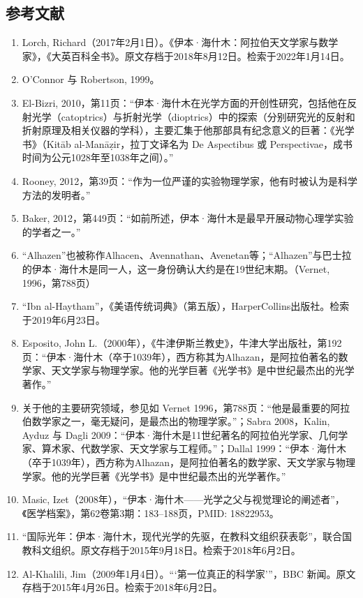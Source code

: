 \subsection{参考文献}
\begin{enumerate}
\item Lorch, Richard（2017年2月1日）。《伊本·海什木：阿拉伯天文学家与数学家》，《大英百科全书》。原文存档于2018年8月12日。检索于2022年1月14日。
\item O'Connor 与 Robertson, 1999。
\item El-Bizri, 2010，第11页：“伊本·海什木在光学方面的开创性研究，包括他在反射光学（catoptrics）与折射光学（dioptrics）中的探索（分别研究光的反射和折射原理及相关仪器的学科），主要汇集于他那部具有纪念意义的巨著：《光学书》（Kitāb al-Manāẓir，拉丁文译名为 De Aspectibus 或 Perspectivae，成书时间为公元1028年至1038年之间）。”
\item Rooney, 2012，第39页：“作为一位严谨的实验物理学家，他有时被认为是科学方法的发明者。”
\item Baker, 2012，第449页：“如前所述，伊本·海什木是最早开展动物心理学实验的学者之一。”
\item “Alhazen”也被称作Alhacen、Avennathan、Avenetan等；“Alhazen”与巴士拉的伊本·海什木是同一人，这一身份确认大约是在19世纪末期。（Vernet, 1996，第788页）
\item “Ibn al-Haytham”，《美语传统词典》（第五版），HarperCollins出版社。检索于2019年6月23日。
\item Esposito, John L.（2000年），《牛津伊斯兰教史》，牛津大学出版社，第192页：“伊本·海什木（卒于1039年），西方称其为Alhazan，是阿拉伯著名的数学家、天文学家与物理学家。他的光学巨著《光学书》是中世纪最杰出的光学著作。”
\item 关于他的主要研究领域，参见如 Vernet 1996，第788页：“他是最重要的阿拉伯数学家之一，毫无疑问，是最杰出的物理学家。”；Sabra 2008，Kalin, Ayduz 与 Dagli 2009：“伊本·海什木是11世纪著名的阿拉伯光学家、几何学家、算术家、代数学家、天文学家与工程师。”；Dallal 1999：“伊本·海什木（卒于1039年），西方称为Alhazan，是阿拉伯著名的数学家、天文学家与物理学家。他的光学巨著《光学书》是中世纪最杰出的光学著作。”
\item Masic, Izet（2008年），“伊本·海什木——光学之父与视觉理论的阐述者”，《医学档案》，第62卷第3期：183–188页，PMID: 18822953。
\item “国际光年：伊本·海什木，现代光学的先驱，在教科文组织获表彰”，联合国教科文组织。原文存档于2015年9月18日。检索于2018年6月2日。
\item Al-Khalili, Jim（2009年1月4日）。“‘第一位真正的科学家’”，BBC 新闻。原文存档于2015年4月26日。检索于2018年6月2日。

\end{enumerate}
